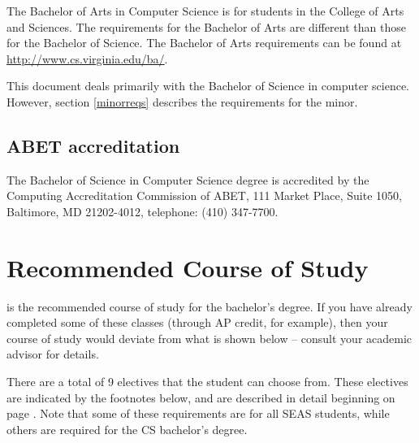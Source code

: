 \documentclass[12pt,twoside]{article}
\newcommand{\textsize}{\Large}
\newcommand{\textsize}{\normalsize}
\begin{document}
The Bachelor of Arts in Computer Science is for students in the
College of Arts and Sciences.  The requirements for the Bachelor of
Arts are different than those for the Bachelor of Science.  The
Bachelor of Arts requirements can be found at
\url{http://www.cs.virginia.edu/ba/}.

This document deals primarily with the Bachelor of Science in computer
science.  However, section \ref{minorreqs} describes the requirements
for the minor.


\subsection{ABET accreditation}

The Bachelor of Science in Computer Science degree is accredited by
the Computing Accreditation Commission of ABET, 111 Market Place,
Suite 1050, Baltimore, MD 21202-4012, telephone: (410) 347-7700. 

\textsize

\section{Recommended Course of Study}
\label{sampleschedule}


 is the
recommended course of study for the bachelor's degree.  If you have
already completed some of these classes (through AP credit, for
example), then your course of study would deviate from what is shown
below -- consult your academic advisor for details.

There are a total of 9 electives that the student can choose from.
These electives are indicated by the footnotes below, and are
described in detail beginning on page \pageref{electiveinformation}.
Note that some of these requirements are for all SEAS students, while
others are required for the CS bachelor's degree.
\end{document}
